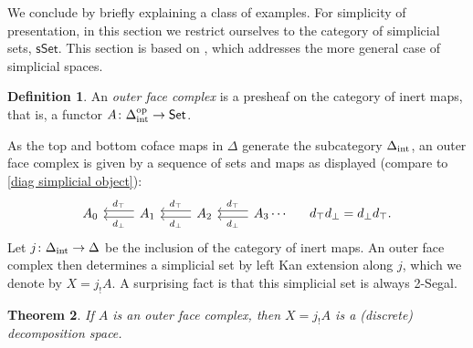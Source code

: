 \documentclass{amsart}
\newtheorem{theorem}{Theorem}[section]
\theoremstyle{definition}
\newtheorem{definition}[theorem]{Definition}
\theoremstyle{remark}
\newcommand{\set}{\mathsf{Set}}
\newcommand{\sset}{\mathsf{sSet}}
\newcommand{\op}{\textup{op}}
\newcommand{\intrm}{\textup{int}}
\newcommand{\delint}{\Delta_\intrm}
\begin{document}
We conclude by briefly explaining a class of examples.
For simplicity of presentation, in this section we restrict ourselves to the category of simplicial sets, $\sset$. 
This section is based on \cite{HackneyKock:FDS}, which addresses the more general case of simplicial spaces.

\begin{definition}
An \emph{outer face complex} is a presheaf on the category of inert maps, that is, a functor $A \colon \delint^\op \to \set$.
\end{definition}

As the top and bottom coface maps in $\Delta$ generate the subcategory $\delint$, an outer face complex is given by a sequence of sets and maps as displayed (compare to \eqref{diag simplicial object}):
\begin{equation}
\begin{tikzcd}
A_0 & A_1 \lar[shift left, "d_\bot"] \lar[shift right, "d_\top"']  & A_2 \lar[shift left, "d_\bot"] \lar[shift right, "d_\top"']
 &
A_3 
\lar[shift left, "d_\bot"] \lar[shift right, "d_\top"'] \cdots &[-0.5cm] d_\top d_\bot = d_\bot d_\top.
\end{tikzcd} \end{equation}
Let $j\colon \delint \to \Delta$ be the inclusion of the category of inert maps.
An outer face complex then determines a simplicial set by left Kan extension along $j$, which we denote by $X = j_! A$.
A surprising fact is that this simplicial set is always 2-Segal.

\begin{theorem}
If $A$ is an outer face complex, then $X = j_! A$ is a (discrete) decomposition space.
\end{theorem}
\end{document}
